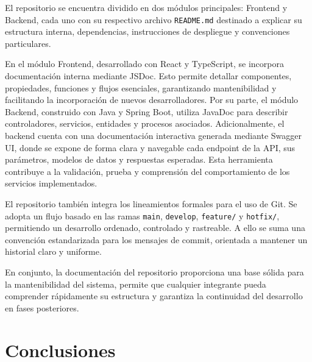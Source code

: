 \documentclass[12pt, a4paper]{article}
\begin{document}
El repositorio se encuentra dividido en dos módulos principales: Frontend y Backend, cada uno con su respectivo archivo \texttt{README.md} destinado a explicar su estructura interna, dependencias, instrucciones de despliegue y convenciones particulares.

En el módulo Frontend, desarrollado con React y TypeScript, se incorpora documentación interna mediante JSDoc. Esto permite detallar componentes, propiedades, funciones y flujos esenciales, garantizando mantenibilidad y facilitando la incorporación de nuevos desarrolladores. Por su parte, el módulo Backend, construido con Java y Spring Boot, utiliza JavaDoc para describir controladores, servicios, entidades y procesos asociados. Adicionalmente, el backend cuenta con una documentación interactiva generada mediante Swagger UI, donde se expone de forma clara y navegable cada endpoint de la API, sus parámetros, modelos de datos y respuestas esperadas. Esta herramienta contribuye a la validación, prueba y comprensión del comportamiento de los servicios implementados.

El repositorio también integra los lineamientos formales para el uso de Git. Se adopta un flujo basado en las ramas \texttt{main}, \texttt{develop}, \texttt{feature/} y \texttt{hotfix/}, permitiendo un desarrollo ordenado, controlado y rastreable. A ello se suma una convención estandarizada para los mensajes de commit, orientada a mantener un historial claro y uniforme.

En conjunto, la documentación del repositorio proporciona una base sólida para la mantenibilidad del sistema, permite que cualquier integrante pueda comprender rápidamente su estructura y garantiza la continuidad del desarrollo en fases posteriores.

\section{Conclusiones }
\newpage
\nocite{*}
\printbibliography[title={Referencias}]
\end{document}

